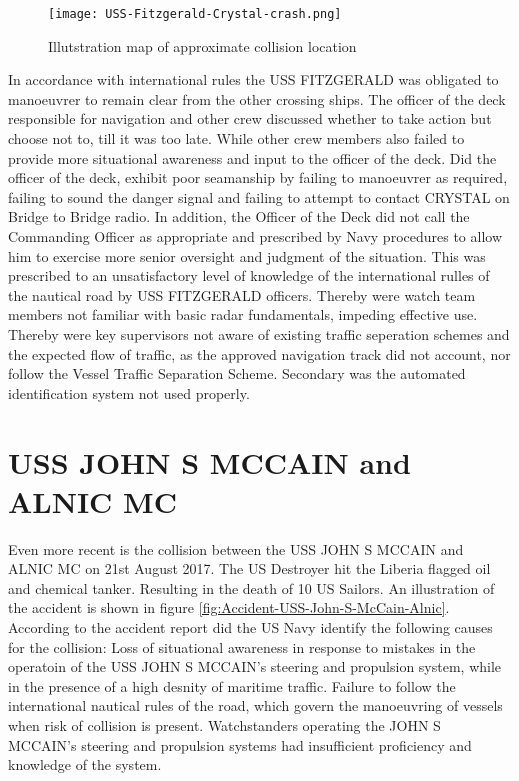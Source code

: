 \begin{figure}[H]
	\centering
	\texttt{[image: USS-Fitzgerald-Crystal-crash.png]}
	\caption{Illutstration map of approximate collision location}
	\label{fig:Accident-USS-Fitzgerald-Crystal}
\end{figure}

In accordance with international rules the USS FITZGERALD was obligated to manoeuvrer to remain clear from the other crossing ships. The officer of the deck responsible for navigation and other crew discussed whether to take action but choose not to, till it was too late. While other crew members also failed to provide more situational awareness and input to the officer of the deck. Did the officer of the deck, exhibit poor seamanship by failing to manoeuvrer as required, failing to sound the danger signal and failing to attempt to contact CRYSTAL on Bridge to Bridge radio. In addition, the Officer of the Deck did not call the Commanding Officer as appropriate and prescribed by Navy procedures to allow him to exercise more senior oversight and judgment of the situation. This was prescribed to an unsatisfactory level of knowledge of the international rulles of the nautical road by USS FITZGERALD officers. Thereby were watch team members not familiar with basic radar fundamentals, impeding effective use. Thereby were key supervisors not aware of existing traffic seperation schemes and the expected flow of traffic, as the approved navigation track did not account, nor follow the Vessel Traffic Separation Scheme. Secondary was the automated identification system not used properly. \cite{USNavy2017}

\newpage
\section{USS JOHN S MCCAIN and ALNIC MC}
Even more recent is the collision between the USS JOHN S MCCAIN and ALNIC MC on 21st August 2017. The US Destroyer hit the Liberia flagged oil and chemical tanker. Resulting in the death of 10  US Sailors. An illustration of the accident is shown in figure \ref{fig:Accident-USS-John-S-McCain-Alnic}. According to the accident report did the US Navy identify the following causes for the collision: Loss of situational awareness in response to mistakes in the operatoin of the USS JOHN S MCCAIN's steering and propulsion system, while in the presence of a high desnity of maritime traffic. Failure to follow the international nautical rules of the road, which govern the manoeuvring of vessels when risk of collision is present. Watchstanders operating the JOHN S MCCAIN's steering and propulsion systems had insufficient proficiency and knowledge of the system. 

